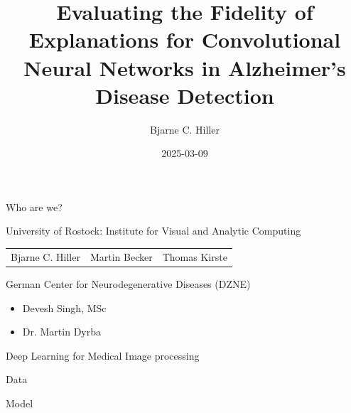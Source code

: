 \documentclass[aspectratio=169]{beamer}
\title[Fidelity of Explanations for AD Classification from MRI]{Evaluating the Fidelity of Explanations for Convolutional Neural Networks in Alzheimer’s Disease Detection}
\author[Hiller]{Bjarne C. Hiller}
\date{2025-03-09}
\institute[Uni Rostock]{University of Rostock}
\begin{document}
\maketitle


%
\begin{frame}{Who are we?}
	\begin{block}{University of Rostock: Institute for Visual and Analytic Computing}
		\begin{tabularx}{\textwidth}{XXX}
			Bjarne C. Hiller & Martin Becker & Thomas Kirste \\
		\end{tabularx}
	\end{block}

	\begin{block}{German Center for Neurodegenerative Diseases (DZNE)}
		\begin{itemize}
			\item Devesh Singh, MSc
			\item Dr. Martin Dyrba
		\end{itemize}
	\end{block}
\end{frame}

\begin{frame}{Deep Learning for Medical Image processing}
\end{frame}

\begin{frame}{Data}
\end{frame}

\begin{frame}{Model}

\end{frame}
\end{document}
